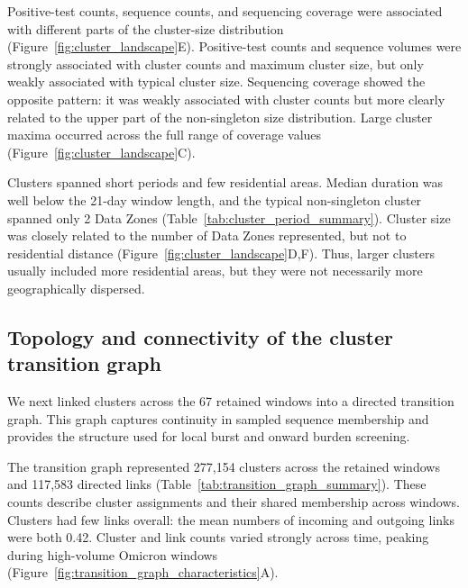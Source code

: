 

Positive-test counts, sequence counts, and sequencing coverage were associated with different parts of the cluster-size distribution (Figure~\ref{fig:cluster_landscape}E). Positive-test counts and sequence volumes were strongly associated with cluster counts and maximum cluster size, but only weakly associated with typical cluster size. Sequencing coverage showed the opposite pattern: it was weakly associated with cluster counts but more clearly related to the upper part of the non-singleton size distribution. Large cluster maxima occurred across the full range of coverage values (Figure~\ref{fig:cluster_landscape}C).

Clusters spanned short periods and few residential areas. Median duration was well below the 21-day window length, and the typical non-singleton cluster spanned only 2 Data Zones (Table~\ref{tab:cluster_period_summary}). Cluster size was closely related to the number of Data Zones represented, but not to residential distance (Figure~\ref{fig:cluster_landscape}D,F). Thus, larger clusters usually included more residential areas, but they were not necessarily more geographically dispersed.

\subsection{Topology and connectivity of the cluster transition graph}\label{sec:ch5_transition_structure}

We next linked clusters across the 67 retained windows into a directed transition graph. This graph captures continuity in sampled sequence membership and provides the structure used for local burst and onward burden screening.

The transition graph represented 277,154 clusters across the retained windows and 117,583 directed links (Table~\ref{tab:transition_graph_summary}). These counts describe cluster assignments and their shared membership across windows. Clusters had few links overall: the mean numbers of incoming and outgoing links were both 0.42. Cluster and link counts varied strongly across time, peaking during high-volume Omicron windows (Figure~\ref{fig:transition_graph_characteristics}A).

